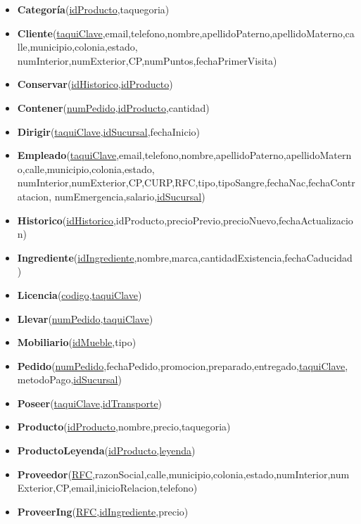 \documentclass[11pt,letterpaper]{article}
\begin{document}
\begin{itemize}
\item \footnotesize{\textbf{Categoría}(\underline{idProducto},taquegoria)}
\item \footnotesize{\textbf{Cliente}(\underline{taquiClave},email,telefono,nombre,apellidoPaterno,apellidoMaterno,calle,municipio,colonia,estado,
numInterior,numExterior,CP,numPuntos,fechaPrimerVisita)}
\item \footnotesize{\textbf{Conservar}(\underline{idHistorico},\underline{idProducto})}
\item \footnotesize{\textbf{Contener}(\underline{numPedido},\underline{idProducto},cantidad)}
\item \footnotesize{\textbf{Dirigir}(\underline{taquiClave},\underline{idSucursal},fechaInicio)}
\item \footnotesize{\textbf{Empleado}(\underline{taquiClave},email,telefono,nombre,apellidoPaterno,apellidoMaterno,calle,municipio,colonia,estado,
numInterior,numExterior,CP,CURP,RFC,tipo,tipoSangre,fechaNac,fechaContratacion,
numEmergencia,salario,\underline{idSucursal})}
\item \footnotesize{\textbf{Historico}(\underline{idHistorico},idProducto,precioPrevio,precioNuevo,fechaActualizacion)}
\item \footnotesize{\textbf{Ingrediente}(\underline{idIngrediente},nombre,marca,cantidadExistencia,fechaCaducidad)}
\item \footnotesize{\textbf{Licencia}(\underline{codigo},\underline{taquiClave}})
\item \footnotesize{\textbf{Llevar}(\underline{numPedido},\underline{taquiClave})}
\item \footnotesize{\textbf{Mobiliario}(\underline{idMueble},tipo)}
\item \footnotesize{\textbf{Pedido}(\underline{numPedido},fechaPedido,promocion,preparado,entregado,\underline{taquiClave},metodoPago,\underline{idSucursal})}
\item \footnotesize{\textbf{Poseer}(\underline{taquiClave},\underline{idTransporte})}
\item \footnotesize{\textbf{Producto}(\underline{idProducto},nombre,precio,taquegoria)}
\item \footnotesize{\textbf{ProductoLeyenda}(\underline{idProducto,leyenda})}
\item \scriptsize{\textbf{Proveedor}(\underline{RFC},razonSocial,calle,municipio,colonia,estado,numInterior,numExterior,CP,email,inicioRelacion,telefono)}
\item \footnotesize{\textbf{ProveerIng}(\underline{RFC},\underline{idIngrediente},precio)}

\end{itemize}
\end{document}
